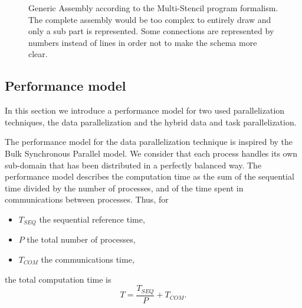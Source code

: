 \begin{figure}[t]
\begin{center}
\vspace*{.5em}
\caption{Generic Assembly according to the Multi-Stencil program formalism.
The complete assembly would be too complex to entirely draw and only a sub part is represented.
Some connections are represented by numbers instead of lines in order not to make the schema more clear.
}
\label{fig:specass}
\end{center}
\end{figure}

\subsection{Performance model}
\label{sect:perfs}

In this section we introduce a performance model for two used parallelization techniques, the data parallelization and the hybrid data and task parallelization.

The performance model for the data parallelization technique is inspired by the Bulk Synchronous Parallel model.
We consider that each process handles its own sub-domain that has been distributed in a perfectly balanced way.
The performance model describes the computation time as the sum of the sequential time divided by the number of processes, and of the time spent in communications between processes. Thus, for
\begin{itemize}
\item $T_{SEQ}$ the sequential reference time, 
\item $P$ the total number of processes, 
\item $T_{COM}$ the communications time, 
\end{itemize}
the total computation time is
\begin{equation}
T = \frac{T_{SEQ}}{P} + T_{COM}.
\end{equation}

